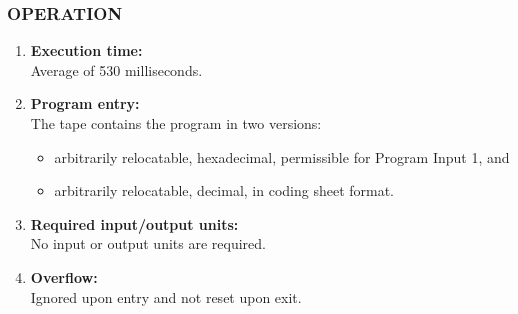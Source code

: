 \subsubsection*{OPERATION}
\begin{enumerate}
    \item \textbf{Execution time:} \\
    Average of 530 milliseconds.
    \item \textbf{Program entry:} \\
    The tape contains the program in two versions:
    \begin{itemize}
        \item[a)] arbitrarily relocatable, hexadecimal, permissible for Program Input 1, and
        \item[b)] arbitrarily relocatable, decimal, in coding sheet format.
    \end{itemize}
    \item \textbf{Required input/output units:} \\
    No input or output units are required.
    \item \textbf{Overflow:} \\
    Ignored upon entry and not reset upon exit.
\end{enumerate}
\newpage